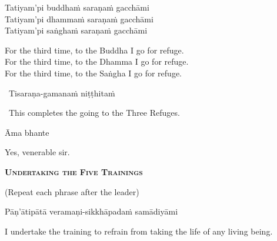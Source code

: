 Tatiyam'pi buddhaṁ saraṇaṁ gacchāmi\\
Tatiyam'pi dhammaṁ saraṇaṁ gacchāmi\\
Tatiyam'pi saṅghaṁ saraṇaṁ gacchāmi

\begin{english-verses}
  For the third time, to the Buddha I go for refuge.\\
  For the third time, to the Dhamma I go for refuge.\\
  For the third time, to the Saṅgha I go for refuge.
\end{english-verses}

\ifafiveversion\clearpage\fi
\ifbfiveversion\clearpage\fi

\begin{leader}
  \anglebracketleft\ \hspace{-0.5mm}Tisaraṇa-gamanaṁ niṭṭhitaṁ \hspace{-0.5mm}\anglebracketright\
\end{leader}
\begin{leader-english-below-pali}
  \anglebracketleft\ \hspace{-0.5mm}This completes the going to the Three Refuges. \hspace{-0.5mm}\anglebracketright\
\end{leader-english-below-pali}

Āma bhante

\begin{english}
  Yes, venerable sir.
\end{english}

\clearpage



\begin{center}
  \textbf{\textsc{Undertaking the Five Trainings}}
\end{center}

\begin{center}
  (Repeat each phrase after the leader)
\end{center}

Pāṇ'ātipātā veramaṇi-sikkhāpadaṁ samādiyāmi

\begin{english-hang}
  I undertake the training\ifdigitalversion\makeatletter\hyperlink{endnote139-appendix}\makeatother \thinspace\fi
  to refrain from taking the life of any living being.
\end{english-hang}

